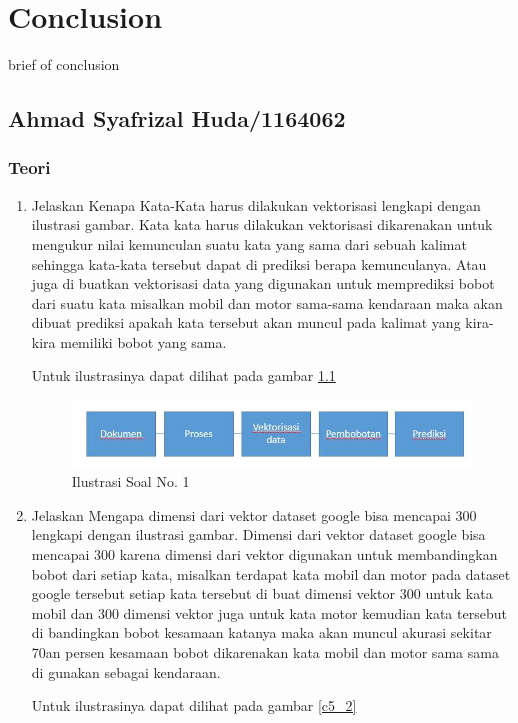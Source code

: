 \chapter{Conclusion}
brief of conclusion

\section{Ahmad Syafrizal Huda/1164062}
\subsection{Teori}
\begin{enumerate}
\item Jelaskan Kenapa Kata-Kata harus dilakukan vektorisasi lengkapi dengan ilustrasi gambar.
\subitem Kata kata harus dilakukan vektorisasi dikarenakan untuk mengukur nilai kemunculan suatu kata yang sama dari sebuah kalimat sehingga kata-kata tersebut dapat di prediksi berapa kemunculanya. Atau juga di buatkan vektorisasi data yang digunakan untuk memprediksi bobot dari suatu kata misalkan mobil dan motor sama-sama kendaraan maka akan dibuat prediksi apakah kata tersebut akan muncul pada kalimat yang kira-kira memiliki bobot yang sama. 
\par Untuk ilustrasinya dapat dilihat pada gambar \ref{c5_1}
\begin{figure}[!htbp]
	\centerline{\includegraphics[width=1\textwidth]{figures/huda/chapter5/1.JPG}}
	\caption{Ilustrasi Soal No. 1}
	\label{c5_1}
\end{figure}
\item Jelaskan Mengapa dimensi dari vektor dataset google bisa mencapai 300 lengkapi dengan ilustrasi gambar.
\subitem Dimensi dari vektor dataset google bisa mencapai 300 karena dimensi dari vektor digunakan untuk membandingkan bobot dari setiap kata, misalkan terdapat kata mobil dan motor pada dataset google tersebut setiap kata tersebut di buat dimensi vektor 300 untuk kata mobil dan 300 dimensi vektor juga untuk kata motor kemudian kata tersebut di bandingkan bobot kesamaan katanya maka akan muncul akurasi sekitar 70an persen kesamaan bobot dikarenakan kata mobil dan motor sama sama di gunakan sebagai kendaraan.
\par Untuk ilustrasinya dapat dilihat pada gambar \ref{c5_2}

\end{enumerate}
